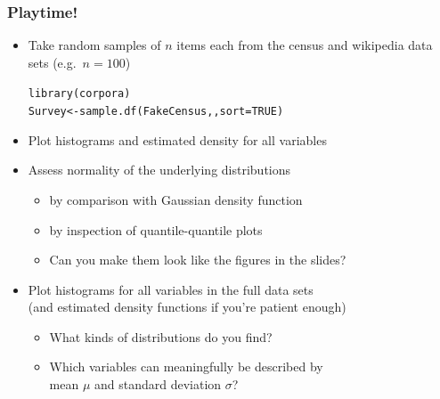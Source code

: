 \documentclass[t]{beamer} %
\begin{document}
\begin{frame}[fragile]
  \frametitle{Playtime!}
  \begin{itemize}
  \item Take random samples of $n$ items each from the census and wikipedia
    data sets (e.g.\ $n=100$)
    \begin{alltt}\color{secondary}
     library(corpora)
     Survey <- sample.df(FakeCensus, \emph{}, sort=TRUE)\end{alltt}
  \item Plot histograms and estimated density for all variables
  \item Assess normality of the underlying distributions
    \begin{itemize}
    \item by comparison with Gaussian density function
    \item by inspection of quantile-quantile plots
    \item[\hand] Can you make them look like the figures in the slides?
    \end{itemize}
  \item Plot histograms for all variables in the full data sets\\
    (and estimated density functions if you're patient enough)
    \begin{itemize}
    \item What kinds of distributions do you find?
    \item Which variables can meaningfully be described by\\
      mean $\mu$ and standard deviation $\sigma$?
    \end{itemize}
  \end{itemize}
\end{frame}


\end{document}
